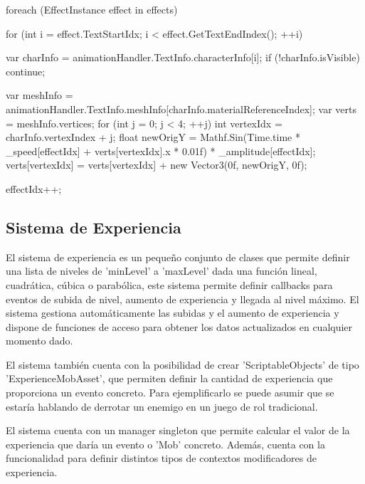 \begin{mypython}[caption={Ejemplo de código utilizado para definir la animación de 'Wobble' en el texto.},label={alg:wobbleAnimation}]
    foreach (EffectInstance effect in effects) 
    {
        for (int i = effect.TextStartIdx; i < effect.GetTextEndIndex(); ++i)
        {
            var charInfo = animationHandler.TextInfo.characterInfo[i];
            if (!charInfo.isVisible)
            {
                continue;
            }
            
            var meshInfo = animationHandler.TextInfo.meshInfo[charInfo.materialReferenceIndex];
            var verts = meshInfo.vertices;
            for (int j = 0; j < 4; ++j)
            {
                int vertexIdx = charInfo.vertexIndex + j;
                float newOrigY = Mathf.Sin(Time.time * _speed[effectIdx] + verts[vertexIdx].x * 0.01f) * _amplitude[effectIdx];
                verts[vertexIdx] = verts[vertexIdx] + new Vector3(0f, newOrigY, 0f);
            }
        }
        effectIdx++;
    }
\end{mypython}

\subsection{Sistema de Experiencia}
El sistema de experiencia es un pequeño conjunto de clases que permite definir una lista de niveles de 'minLevel' a 'maxLevel' dada una función lineal, cuadrática, cúbica o 
 parabólica, este sistema permite definir callbacks para eventos de subida de nivel, aumento de experiencia y llegada al nivel máximo. El sistema gestiona automáticamente las
 subidas y el aumento de experiencia y dispone de funciones de acceso para obtener los datos actualizados en cualquier momento dado.

El sistema también cuenta con la posibilidad de crear 'ScriptableObjects' de tipo 'ExperienceMobAsset', que permiten definir la cantidad de experiencia que proporciona un evento 
 concreto. Para ejemplificarlo se puede asumir que se estaría hablando de derrotar un enemigo en un juego de rol tradicional. 
 
 El sistema cuenta con un manager singleton que permite calcular el valor de la experiencia que daría un evento o 'Mob' concreto. Además, cuenta con la
  funcionalidad para definir distintos tipos de contextos modificadores de experiencia.


